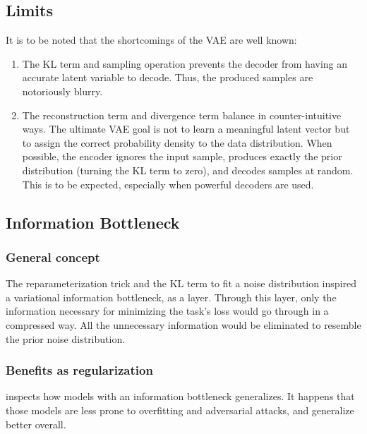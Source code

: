 \subsection{Limits}

It is to be noted that the shortcomings of the VAE are well known:

\begin{enumerate}
    \item The KL term and sampling operation prevents the decoder from having an accurate latent variable to decode. Thus, the produced samples are notoriously blurry.
    
    \item The reconstruction term and divergence term balance in counter-intuitive ways. The ultimate VAE goal is not to learn a meaningful latent vector but to assign the correct probability density to the data distribution. When possible, the encoder ignores the input sample, produces exactly the prior distribution (turning the KL term to zero), and decodes samples at random. This is to be expected, especially when powerful decoders are used.
\end{enumerate}



\subsection{Information Bottleneck}

\subsubsection{General concept}

The reparameterization trick and the KL term to fit a noise distribution inspired a variational information bottleneck, as a layer. Through this layer, only the information necessary for minimizing the task's loss would go through in a compressed way. All the unnecessary information would be eliminated to resemble the prior noise distribution.

\subsubsection{Benefits as regularization}

\citet{informationbottleneck} inspects how models with an information bottleneck generalizes. It happens that those models are less prone to overfitting and adversarial attacks, and generalize better overall.

